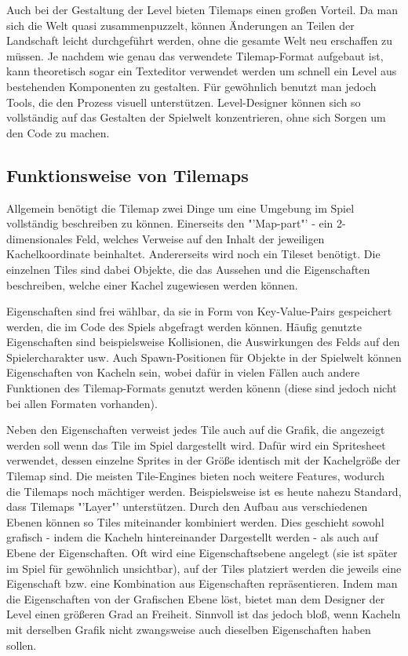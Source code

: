 Auch bei der Gestaltung der Level bieten Tilemaps einen großen Vorteil. Da man sich die Welt quasi zusammenpuzzelt, können Änderungen an Teilen der Landschaft leicht durchgeführt werden, ohne die gesamte Welt neu erschaffen zu müssen. Je nachdem wie genau das verwendete Tilemap-Format aufgebaut ist, kann theoretisch sogar ein Texteditor verwendet werden um schnell ein Level aus bestehenden Komponenten zu gestalten. Für gewöhnlich benutzt man jedoch Tools, die den Prozess visuell unterstützen. Level-Designer können sich so vollständig auf das Gestalten der Spielwelt konzentrieren, ohne sich Sorgen um den Code zu machen.

\subsection{Funktionsweise von Tilemaps}
Allgemein benötigt die Tilemap zwei Dinge um eine Umgebung im Spiel vollständig beschreiben zu können. Einerseits den "'Map-part"' - ein 2-dimensionales Feld, welches Verweise auf den Inhalt der jeweiligen Kachelkoordinate beinhaltet. Andererseits wird noch ein Tileset benötigt. Die einzelnen Tiles sind dabei Objekte, die das Aussehen und die Eigenschaften beschreiben, welche einer Kachel zugewiesen werden können.

Eigenschaften sind frei wählbar, da sie in Form von Key-Value-Pairs gespeichert werden, die im Code des Spiels abgefragt werden können. Häufig genutzte Eigenschaften sind beispielsweise Kollisionen, die Auswirkungen des Felds auf den Spielercharakter usw. Auch Spawn-Positionen für Objekte in der Spielwelt können Eigenschaften von Kacheln sein, wobei dafür in vielen Fällen auch andere Funktionen des Tilemap-Formats genutzt werden könenn (diese sind jedoch nicht bei allen Formaten vorhanden). 

Neben den Eigenschaften verweist jedes Tile auch auf die Grafik, die angezeigt werden soll wenn das Tile im Spiel dargestellt wird. Dafür wird ein Spritesheet verwendet, dessen einzelne Sprites in der Größe identisch mit der Kachelgröße der Tilemap sind.
Die meisten Tile-Engines bieten noch weitere Features, wodurch die Tilemaps noch mächtiger werden. Beispielsweise ist es heute nahezu Standard, dass Tilemaps "'Layer"' unterstützen. Durch den Aufbau aus verschiedenen Ebenen können so Tiles miteinander kombiniert werden. Dies geschieht sowohl grafisch - indem die Kacheln hintereinander Dargestellt werden -  als auch auf Ebene der Eigenschaften. Oft wird eine Eigenschaftsebene angelegt (sie ist später im Spiel für gewöhnlich unsichtbar), auf der Tiles platziert werden die jeweils eine Eigenschaft bzw. eine Kombination aus Eigenschaften repräsentieren. Indem man die Eigenschaften von der Grafischen Ebene löst, bietet man dem Designer der Level einen größeren Grad an Freiheit. Sinnvoll ist das jedoch bloß, wenn Kacheln mit derselben Grafik nicht zwangsweise auch dieselben Eigenschaften haben sollen. 


